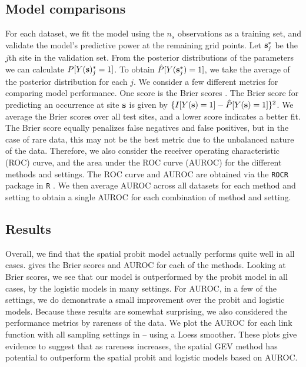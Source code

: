 \subsection{Model comparisons}\label{rbs:cv}

For each dataset, we fit the model using the $n_s$ observations as a training set, and validate the model's predictive power at the remaining grid points.
Let $\mathbf{s}^*_j$ be the $j$th site in the validation set.
From the posterior distributions of the parameters we can calculate $P[Y(\mathbf{s})^*_j = 1]$.
To obtain $\hat{P}[Y(\mathbf{s}^*_j) = 1]$, we take the average of the posterior distribution for each $j$.
We consider a few different metrics for comparing model performance.
One score is the Brier scores \citep[BS]{Gneiting2007}.
The Brier score for predicting an occurrence at site $\mathbf{s}$ is given by $\{I[Y(\mathbf{s})=1] - \hat{P}[Y(\mathbf{s})=1]\}^2$.
We average the Brier scores over all test sites, and a lower score indicates a better fit.
The Brier score equally penalizes false negatives and false positives, but in the case of rare data, this may not be the best metric due to the unbalanced nature of the data.
Therefore, we also consider the receiver operating characteristic (ROC) curve, and the area under the ROC curve (AUROC) for the different methods and settings.
The ROC curve and AUROC are obtained via the \texttt{ROCR} \citep{Sing2005} package in \texttt{R} \citep{Rmanual}.
We then average AUROC across all datasets for each method and setting to obtain a single AUROC for each combination of method and setting.

\subsection{Results} \label{rbs:simresults}

Overall, we find that the spatial probit model actually performs quite well in all cases.
 gives the Brier scores and AUROC for each of the methods.
Looking at Brier scores, we see that our model is outperformed by the probit model in all cases, by the logistic models in many settings.
For AUROC, in a few of the settings, we do demonstrate a small improvement over the probit and logistic models.
Because these results are somewhat surprising, we also considered the performance metrics by rareness of the data.
We plot the AUROC for each link function with all sampling settings in  --  using a Loess smoother.
These plots give evidence to suggest that as rareness increases, the spatial GEV method has potential to outperform the spatial probit and logistic models based on AUROC.

